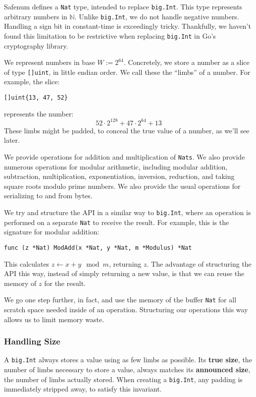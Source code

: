 \documentclass[11pt, a4paper]{article} %
\begin{document}
{Safenum defines a \texttt{Nat} type, intended to
replace \texttt{big.Int}. This type represents arbitrary
numbers in $\mathbb{N}$. Unlike \texttt{big.Int}, we do not handle
negative numbers. Handling a sign bit in constant-time is exceedingly
tricky. Thankfully, we haven't found this limitation to be restrictive
when replacing \texttt{big.Int} in Go's cryptography library.

We represent numbers in base $W := 2^{64}$. Concretely, we
store a number as a slice of type \texttt{[]uint}, in little
endian order. We call these the \enquote{limbs} of a number. For example,
the slice:
\begin{verbatim}
[]uint{13, 47, 52}
\end{verbatim}
represents the number:
$$
52 \cdot 2^{128} + 47 \cdot 2^{64} + 13
$$
These limbs might be padded, to conceal the true value of a number,
as we'll see later.

We provide operations for addition and multiplication of \texttt{Nats}.
We also provide numerous operations
for modular arithmetic, including modular addition, subtraction,
multiplication, exponentiation, inversion, reduction, and taking
square roots modulo prime numbers. We also provide the usual operations
for serializing to and from bytes.

We try and structure the API in a similar way to \texttt{big.Int},
where an operation is performed on a separate
\texttt{Nat} to receive the result.
For example, this is the signature for
modular addition:

\begin{verbatim}
func (z *Nat) ModAdd(x *Nat, y *Nat, m *Modulus) *Nat
\end{verbatim}

This calculates $z \leftarrow x + y \mod m$, returning $z$. The advantage
of structuring the API this way, instead of simply returning a new
value, is that we can reuse the memory of $z$ for the result.

We go one step further, in fact, and use the memory of the buffer
\texttt{Nat} for all scratch space needed inside of an operation.
Structuring our operations this way allows us to limit memory waste.

\subsubsection{Handling Size}

A \texttt{big.Int} always stores a value using as few limbs
as possible. Its \textbf{true size}, the number of limbs
necessary to store a value, always matches its \textbf{announced size},
the number of limbs actually stored. When creating
a \texttt{big.Int}, any padding is immediately stripped away,
to satisfy this invariant.

}
\end{document}
